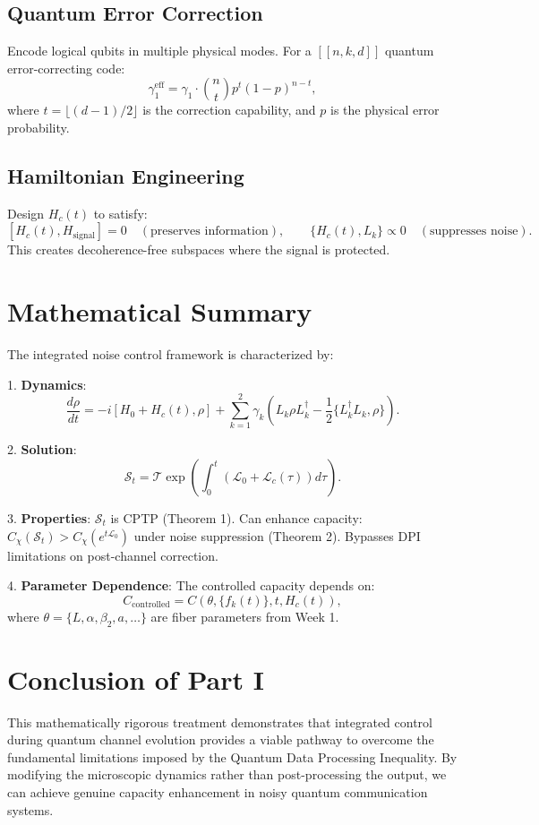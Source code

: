 \documentclass[12pt]{article}
\newcommand{\SJ}{\mathcal{S}}
\newcommand{\Lgen}{\mathcal{L}}
\newcommand{\T}{\mathcal{T}}
\begin{document}
\subsection{Quantum Error Correction}
Encode logical qubits in multiple physical modes. For a $[[n,k,d]]$ quantum error-correcting code:
\[
\gamma_{1}^{\mathrm{eff}} = \gamma_{1}\cdot \binom{n}{t} p^{t}(1 - p)^{n - t},
\]
where $t = \lfloor (d - 1) / 2\rfloor$ is the correction capability, and $p$ is the physical error probability.

\subsection{Hamiltonian Engineering}
Design $H_{c}(t)$ to satisfy:
\[
[H_{c}(t),H_{\mathrm{signal}}] = 0 \quad (\text{preserves information}), \qquad
\{H_{c}(t),L_{k}\} \propto 0 \quad (\text{suppresses noise}).
\]
This creates decoherence-free subspaces where the signal is protected.

\section{Mathematical Summary}
The integrated noise control framework is characterized by:

1. \textbf{Dynamics}:
\[
\frac{d\rho}{dt} = -i[H_0 + H_c(t),\rho ] + \sum_{k = 1}^{2}\gamma_k\left(L_k\rho L_k^\dagger -\frac{1}{2}\{L_k^\dagger L_k,\rho \}\right).
\]

2. \textbf{Solution}:
\[
\SJ_t = \T\exp \left(\int_0^t (\Lgen_0 + \Lgen_c(\tau))d\tau\right).
\]

3. \textbf{Properties}:
$\SJ_t$ is CPTP (Theorem 1). Can enhance capacity: $C_{\chi}(\SJ_t) > C_{\chi}(e^{t\Lgen_0})$ under noise suppression (Theorem 2). Bypasses DPI limitations on post-channel correction.

4. \textbf{Parameter Dependence}: The controlled capacity depends on:
\[
C_{\mathrm{controlled}} = C(\theta ,\{f_k(t)\} ,t,H_c(t)),
\]
where $\theta = \{L,\alpha ,\beta_2,a,\ldots \}$ are fiber parameters from Week 1.

\section{Conclusion of Part I}
This mathematically rigorous treatment demonstrates that integrated control during quantum channel evolution provides a viable pathway to overcome the fundamental limitations imposed by the Quantum Data Processing Inequality. By modifying the microscopic dynamics rather than post-processing the output, we can achieve genuine capacity enhancement in noisy quantum communication systems.
\end{document}
